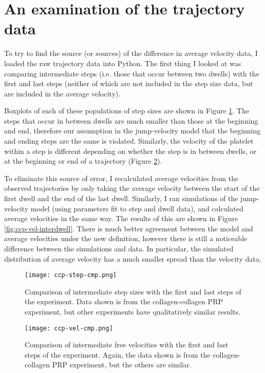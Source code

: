 \documentclass{article}
\begin{document}
\section{An examination of the trajectory data}
\label{sec:an-exam-traj}

To try to find the source (or sources) of the difference in average
velocity data, I loaded the raw trajectory data into Python. The first
thing I looked at was comparing intermediate steps (i.e. those that
occur between two dwells) with the first and last steps (neither of
which are not included in the step size data, but are included in the
average velocity).

Boxplots of each of these populations of step sizes are shown in
Figure \ref{fig:ccp-step-cmp}. The steps that occur in between dwells
are much smaller than those at the beginning and end, therefore our
assumption in the jump-velocity model that the beginning and ending
steps are the same is violated. Similarly, the velocity of the
platelet within a step is different depending on whether the step is
in between dwells, or at the beginning or end of a trajectory (Figure
\ref{fig:ccp-vel-cmp}).

To eliminate this source of error, I recalculated average velocities
from the observed trajectories by only taking the average velocity
between the start of the first dwell and the end of the last
dwell. Similarly, I ran simulations of the jump-velocity model (using
parameters fit to step and dwell data), and calculated average
velocities in the same way. The results of this are shown in Figure
\ref{fig:ccp-vel-interdwell}. There is much better agreement between
the model and average velocities under the new definition, however
there is still a noticeable difference between the simulations and
data. In particular, the simulated distribution of average velocity
has a much smaller spread than the velocity data.

\begin{figure}
  \centering
  \texttt{[image: ccp-step-cmp.png]}
  \caption{Comparison of intermediate step sizes with the first and
    last steps of the experiment. Data shown is from the
    collagen-collagen PRP experiment, but other experiments have
    qualitatively similar results.}
  \label{fig:ccp-step-cmp}
\end{figure}

\begin{figure}
  \centering
  \texttt{[image: ccp-vel-cmp.png]}
  \caption{Comparison of intermediate free velocities with the first
    and last steps of the experiment. Again, the data shown is from
    the collagen-collagen PRP experiment, but the others are similar.}
  \label{fig:ccp-vel-cmp}
\end{figure}
\end{document}
